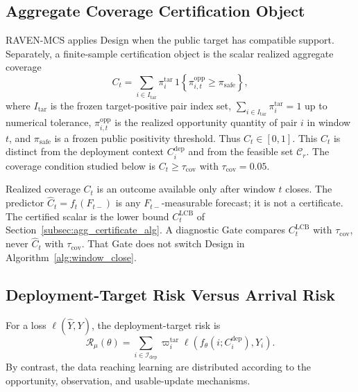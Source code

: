\documentclass[letterpaper,journal]{IEEEtran}
\begin{document}
\subsection{Aggregate Coverage Certification Object}
\label{subsec:agg_coverage_object}

RAVEN-MCS applies Design when the public target has compatible support.
Separately, a finite-sample certification object is the scalar realized
aggregate coverage
\begin{equation}
 C_t
 =
 \sum_{i\in I_{\mathrm{tar}}}
 \pi_i^{\mathrm{tar}}
 \,
 1\!\left\{\pi_{i,t}^{\mathrm{opp}}\ge\pi_{\mathrm{safe}}\right\},
 \label{eq:agg_Ct}
\end{equation}
where $I_{\mathrm{tar}}$ is the frozen target-positive pair index set,
$\sum_{i\in I_{\mathrm{tar}}}\pi_i^{\mathrm{tar}}=1$ up to numerical tolerance,
$\pi_{i,t}^{\mathrm{opp}}$ is the realized opportunity quantity of pair $i$ in
window $t$, and $\pi_{\mathrm{safe}}$ is a frozen public positivity threshold.
Thus $C_t\in[0,1]$.  This $C_t$ is distinct from the
deployment context $C_i^{\mathrm{dep}}$ and from the feasible set
$\mathcal{C}_r$.  The coverage condition studied below is
$C_t\ge\tau_{\mathrm{cov}}$ with $\tau_{\mathrm{cov}}=0.05$.

Realized coverage $C_t$ is an outcome available only after window $t$
closes.  The predictor $\widehat C_t=f_t(F_{t-})$ is any
$F_{t-}$-measurable forecast; it is not a certificate.  The certified
scalar is the lower bound $C^{\mathrm{LCB}}_t$ of
Section~\ref{subsec:agg_certificate_alg}.  A diagnostic Gate compares
$C^{\mathrm{LCB}}_t$ with $\tau_{\mathrm{cov}}$, never $\widehat C_t$
with $\tau_{\mathrm{cov}}$.  That Gate does not switch Design in
Algorithm~\ref{alg:window_close}.

\subsection{Deployment-Target Risk Versus Arrival Risk}
\label{subsec:target_risk}

For a loss $\ell(\widehat Y,Y)$, the deployment-target risk is
\begin{equation}
 \mathcal{R}_{\mu}(\theta)
 =
 \sum_{i\in\mathcal{I}_{\mathrm{dep}}}
 \varpi_i^{\mathrm{tar}}
 \ell\!\left(
 f_{\theta}(i;C_i^{\mathrm{dep}}),Y_i
 \right).
 \label{eq:target_risk}
\end{equation}
By contrast, the data reaching learning are distributed according to the
opportunity, observation, and usable-update mechanisms.
\end{document}
